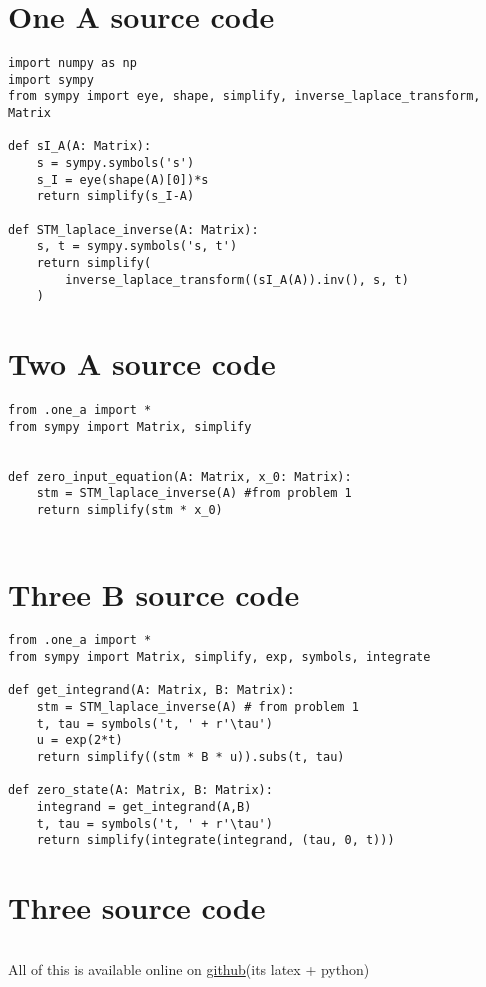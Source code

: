 \appendix

\section{One A source code} \label{appendix:one-a-src}
\begin{verbatim}
import numpy as np
import sympy
from sympy import eye, shape, simplify, inverse_laplace_transform, Matrix

def sI_A(A: Matrix):
    s = sympy.symbols('s')
    s_I = eye(shape(A)[0])*s
    return simplify(s_I-A)

def STM_laplace_inverse(A: Matrix):
    s, t = sympy.symbols('s, t')
    return simplify(
        inverse_laplace_transform((sI_A(A)).inv(), s, t)
    )
\end{verbatim}

\section{Two A source code} \label{appendix:two-a-src}
\begin{verbatim}
from .one_a import *
from sympy import Matrix, simplify


def zero_input_equation(A: Matrix, x_0: Matrix):
    stm = STM_laplace_inverse(A) #from problem 1 
    return simplify(stm * x_0)


\end{verbatim}

\section{Three B source code} \label{appendix:two-b-src}
\begin{verbatim}
from .one_a import *
from sympy import Matrix, simplify, exp, symbols, integrate

def get_integrand(A: Matrix, B: Matrix):
    stm = STM_laplace_inverse(A) # from problem 1
    t, tau = symbols('t, ' + r'\tau')
    u = exp(2*t)
    return simplify((stm * B * u)).subs(t, tau)
    
def zero_state(A: Matrix, B: Matrix):
    integrand = get_integrand(A,B)
    t, tau = symbols('t, ' + r'\tau')
    return simplify(integrate(integrand, (tau, 0, t)))
\end{verbatim}

\section{Three source code} \label{appendix:three-src}
\begin{verbatim}

\end{verbatim}


All of this is available online on \href{https://github.com/NathanRoseCE/ControlsClass}{github}(its latex +
python)